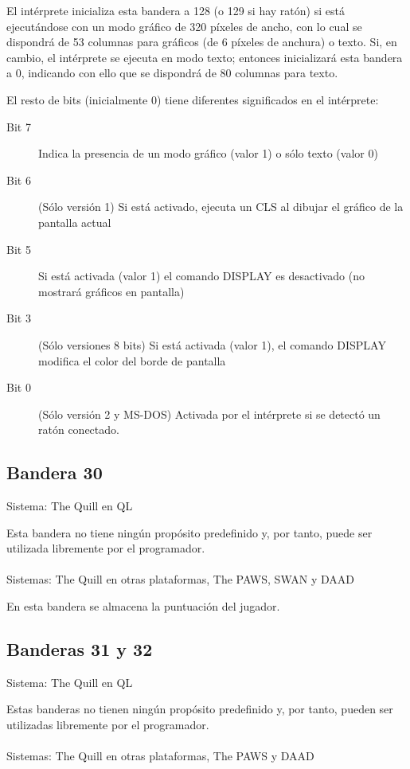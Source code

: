 \documentclass[11pt, a5paper]{article}
\newcommand{\quill}{\textsf{The Quill}\xspace}
\newcommand{\paw}{\textsf{The PAWS}\xspace}
\newcommand{\swan}{\textsf{SWAN}\xspace}
\newcommand{\daad}{\textsf{DAAD}\xspace}
\newcommand{\sistema}[1]{\noindent Sistema: #1 \nopagebreak}
\newcommand{\sistemas}[1]{\noindent Sistemas: #1 \nopagebreak}
\begin{document}
El intérprete inicializa esta bandera a 128 (o 129 si hay ratón) si está ejecutándose con un modo gráfico de 320 píxeles de ancho, con lo cual se dispondrá de 53 columnas para gráficos (de 6 píxeles de anchura) o texto. Si, en cambio, el intérprete se ejecuta en modo texto; entonces inicializará esta bandera a 0, indicando con ello que se dispondrá de 80 columnas para texto.

El resto de bits (inicialmente 0) tiene diferentes significados en el intérprete:

\begin{description}
  \item[Bit 7] Indica la presencia de un modo gráfico (valor 1) o sólo texto (valor 0)
  \item[Bit 6] (Sólo versión 1) Si está activado, ejecuta un CLS al dibujar el gráfico de la pantalla actual
  \item[Bit 5] Si está activada (valor 1) el comando DISPLAY es desactivado (no mostrará gráficos en pantalla)
  \item[Bit 3] (Sólo versiones 8 bits) Si está activada (valor 1), el comando DISPLAY modifica el color del borde de pantalla
  \item[Bit 0] (Sólo versión 2 y MS-DOS) Activada por el intérprete si se detectó un ratón conectado.
\end{description}

\subsection{Bandera 30}

\sistema{\quill en QL}

Esta bandera no tiene ningún propósito predefinido y, por tanto, puede ser utilizada libremente por el programador.
\\\ \\
\sistemas{\quill en otras plataformas, \paw, \swan y \daad}

En esta bandera se almacena la puntuación del jugador.

\subsection{Banderas 31 y 32}

\sistema{\quill en QL}

Estas banderas no tienen ningún propósito predefinido y, por tanto, pueden ser utilizadas libremente por el programador.
\\\ \\
\sistemas{\quill en otras plataformas, \paw y \daad}
\end{document}
